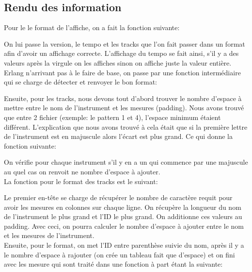 \documentclass[10pt,a4paper]{article}
\begin{document}
\subsection{Rendu des information}

Pour le le format de l'affiche, on a fait la fonction suivante:



On lui passe la version, le tempo et les tracks que l'on fait passer dans un format afin d'avoir un affichage correcte. L'affichage du tempo se fait ainsi, s'il y a des valeurs après la virgule on les affiches sinon on affiche juste la valeur entière. Erlang n'arrivant pas à le faire de base, on passe par une fonction intermédiaire qui se charge de détecter et renvoyer le bon format:



Ensuite, pour les tracks, nous devons tout d'abord trouver le nombre d'espace à mettre entre le nom de l'instrument et les mesures (padding). Nous avons trouvé que entre 2 fichier (exemple: le pattern 1 et 4), l'espace minimum étaient différent. L'explication que nous avons trouvé à cela était que si la première lettre de l'instrument est en majuscule alors l'écart est plus grand. Ce qui donne la fonction suivante:



On vérifie pour chaque instrument s'il y en a un qui commence par une majuscule au quel cas on renvoit ne nombre d'espace à ajouter.\\

La fonction pour le format des tracks est le suivant:



Le premier en-tête se charge de récupérer le nombre de caractère requit pour avoir les mesures en colonnes sur chaque ligne. On récupère la longueur du nom de l'instrument le plus grand et l'ID le plus grand. On additionne ces valeurs au padding. Avec ceci, on pourra calculer le nombre d'espace à ajouter entre le nom et les mesures de l'instrument.\\

Ensuite, pour le format, on met l'ID entre parenthèse suivie du nom, après il y a le nombre d'espace à rajouter (on crée un tableau fait que d'espace) et on fini avec les mesure qui sont traité dans une fonction à part étant la suivante:
\end{document}
